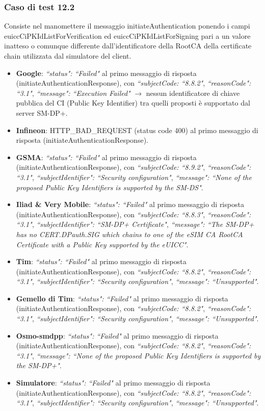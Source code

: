 \documentclass[10pt, oneside]{book}
\begin{document}
\subsubsection{Caso di test 12.2}
Consiste nel manomettere il messaggio initiateAuthentication ponendo i campi euiccCiPKIdListForVerification ed euiccCiPKIdListForSigning pari a un valore inatteso o comunque differente dall'identificatore della RootCA della certificate chain utilizzata dal simulatore del client.
\begin{itemize}
\item \textbf{Google}: \textit{``status": ``Failed"} al primo messaggio di risposta (initiateAuthenticationResponse), con \textit{``subjectCode: ``8.8.2"}, \textit{``reasonCode": ``3.1"}, \textit{``message": ``Execution Failed"} $\rightarrow$ nessun identificatore di chiave pubblica del CI (Public Key Identifier) tra quelli proposti è supportato dal server SM-DP+.
\item \textbf{Infineon}: HTTP\_BAD\_REQUEST (status code 400) al primo messaggio di risposta (initiateAuthenticationResponse).
\item \textbf{GSMA}: \textit{``status": ``Failed"} al primo messaggio di risposta (initiateAuthenticationResponse), con \textit{``subjectCode: ``8.9.2"}, \textit{``reasonCode": ``3.1"}, \textit{``subjectIdentifier": ``Security configuration"}, \textit{``message": ``None of the proposed Public Key Identifiers is supported by the SM-DS"}.
\item \textbf{Iliad \& Very Mobile}: \textit{``status": ``Failed"} al primo messaggio di risposta (initiateAuthenticationResponse), con \textit{``subjectCode: ``8.8.3"}, \textit{``reasonCode": ``3.1"}, \textit{``subjectIdentifier": ``SM-DP+ Certificate"}, \textit{``message": ``The SM-DP+ has no CERT.DPauth.SIG which chains to one of the eSIM CA RootCA Certificate with a Public Key supported by the eUICC"}.
\item \textbf{Tim}: \textit{``status": ``Failed"} al primo messaggio di risposta (initiateAuthenticationResponse), con \textit{``subjectCode: ``8.8.2"}, \textit{``reasonCode": ``3.1"}, \textit{``subjectIdentifier": ``Security configuration"}, \textit{``message": ``Unsupported"}.
\item \textbf{Gemello di Tim}: \textit{``status": ``Failed"} al primo messaggio di risposta (initiateAuthenticationResponse), con \textit{``subjectCode: ``8.8.2"}, \textit{``reasonCode": ``3.1"}, \textit{``subjectIdentifier": ``Security configuration"}, \textit{``message": ``Unsupported"}.
\item \textbf{Osmo-smdpp}: \textit{``status": ``Failed"} al primo messaggio di risposta (initiateAuthenticationResponse), con \textit{``subjectCode: ``8.8.2"}, \textit{``reasonCode": ``3.1"}, \textit{``message": ``None of the proposed Public Key Identifiers is supported by the SM-DP+"}.
\item \textbf{Simulatore}: \textit{``status": ``Failed"} al primo messaggio di risposta (initiateAuthenticationResponse), con \textit{``subjectCode: ``8.8.2"}, \textit{``reasonCode": ``3.1"}, \textit{``subjectIdentifier": ``Security configuration"}, \textit{``message": ``Unsupported"}.
\end{itemize}
\end{document}
